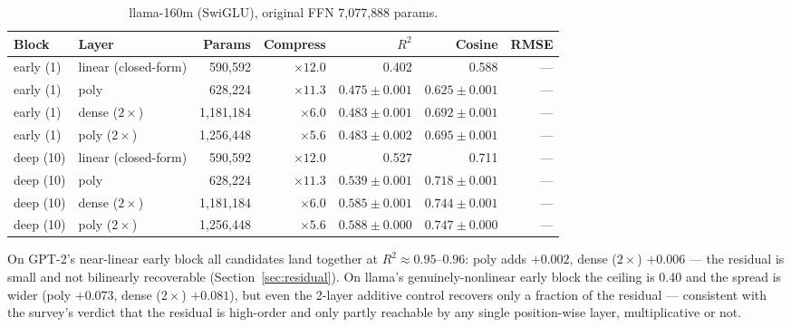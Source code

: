 \documentclass{article}
\begin{document}
\begin{table}[t]
  \centering
  \small
  \setlength{\tabcolsep}{5pt}
  \caption{llama-160m (SwiGLU), original FFN 7{,}077{,}888 params.}
  \label{tab:fidelity-llama}
  \begin{tabular}{llrrrrr}
    \toprule
    Block & Layer & Params & Compress & $R^2$ & Cosine & RMSE \\
    \midrule
    early (1) & linear (closed-form) & 590{,}592   & $\times 12.0$ & 0.402 & 0.588 & --- \\
    early (1) & poly                 & 628{,}224   & $\times 11.3$ & $0.475 \pm 0.001$ & $0.625 \pm 0.001$ & --- \\
    early (1) & dense ($2\times$)    & 1{,}181{,}184 & $\times 6.0$  & $0.483 \pm 0.001$ & $0.692 \pm 0.001$ & --- \\
    early (1) & poly ($2\times$)     & 1{,}256{,}448 & $\times 5.6$  & $0.483 \pm 0.002$ & $0.695 \pm 0.001$ & --- \\
    deep (10) & linear (closed-form) & 590{,}592   & $\times 12.0$ & 0.527 & 0.711 & --- \\
    deep (10) & poly                 & 628{,}224   & $\times 11.3$ & $0.539 \pm 0.001$ & $0.718 \pm 0.001$ & --- \\
    deep (10) & dense ($2\times$)    & 1{,}181{,}184 & $\times 6.0$  & $0.585 \pm 0.001$ & $0.744 \pm 0.001$ & --- \\
    deep (10) & poly ($2\times$)     & 1{,}256{,}448 & $\times 5.6$  & $0.588 \pm 0.000$ & $0.747 \pm 0.000$ & --- \\
    \bottomrule
  \end{tabular}
\end{table}

On GPT-2's near-linear early block all candidates land together at $R^2 \approx 0.95$--$0.96$:
poly adds $+0.002$, dense ($2\times$) $+0.006$ --- the residual is small and not bilinearly
recoverable (Section~\ref{sec:residual}). On llama's genuinely-nonlinear early block the ceiling
is 0.40 and the spread is wider (poly $+0.073$, dense ($2\times$) $+0.081$), but even the 2-layer
additive control recovers only a fraction of the residual --- consistent with the survey's
verdict that the residual is high-order and only partly reachable by any single position-wise
layer, multiplicative or not.
\end{document}
